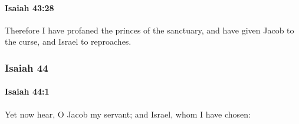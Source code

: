 		\paragraph{Isaiah 43:28} %
			\label{ISAIAH-43-28}

			Therefore I have profaned the princes of the sanctuary, and have given Jacob to the curse, and Israel to reproaches.

	\subsubsection{Isaiah 44} %
		\label{ISAIAH-44}

		\paragraph{Isaiah 44:1} %
			\label{ISAIAH-44-1}

			Yet now hear, O Jacob my servant; and Israel, whom I have chosen:

